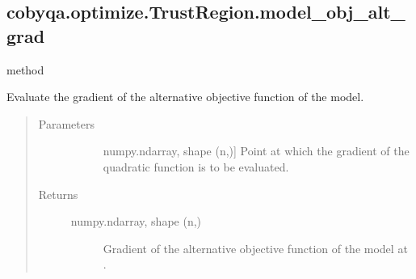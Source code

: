 \documentclass[letterpaper,10pt,english]{sphinxmanual}
\begin{document}
\begin{fulllineitems}
\begin{fulllineitems}
\begin{quote}
\begin{description}
\begin{description}
\end{description}

\end{description}\end{quote}

\end{fulllineitems}



\subsection{cobyqa.optimize.TrustRegion.model\_obj\_alt\_grad}
\label{\detokenize{refs/generated/cobyqa.optimize.TrustRegion.model_obj_alt_grad:cobyqa-optimize-trustregion-model-obj-alt-grad}}\label{\detokenize{refs/generated/cobyqa.optimize.TrustRegion.model_obj_alt_grad::doc}}
\sphinxAtStartPar
method

\begin{fulllineitems}
\label{\detokenize{refs/generated/cobyqa.optimize.TrustRegion.model_obj_alt_grad:cobyqa.optimize.TrustRegion.model_obj_alt_grad}}
\sphinxAtStartPar
Evaluate the gradient of the alternative objective function of the
model.
\begin{quote}\begin{description}
\item[{Parameters}] \leavevmode\begin{description}
\item[{}] \leavevmode{[}numpy.ndarray, shape (n,){]}
\sphinxAtStartPar
Point at which the gradient of the quadratic function is to be
evaluated.

\end{description}

\item[{Returns}] \leavevmode\begin{description}
\item[{numpy.ndarray, shape (n,)}] \leavevmode
\sphinxAtStartPar
Gradient of the alternative objective function of the model at .

\end{description}

\end{description}\end{quote}


\end{fulllineitems}
\end{fulllineitems}
\end{document}
